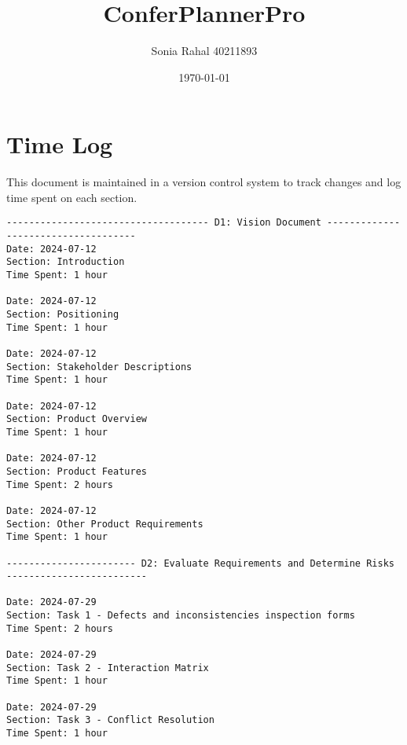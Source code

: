 \documentclass{article}
\begin{document}
\title{ConferPlannerPro}
\author{Sonia Rahal 40211893}
\date{\today}
\maketitle

\section{Time Log}
This document is maintained in a version control system to track changes and log time spent on each section.
\begin{verbatim}
------------------------------------ D1: Vision Document ------------------------------------
Date: 2024-07-12
Section: Introduction
Time Spent: 1 hour

Date: 2024-07-12
Section: Positioning
Time Spent: 1 hour

Date: 2024-07-12
Section: Stakeholder Descriptions
Time Spent: 1 hour

Date: 2024-07-12
Section: Product Overview
Time Spent: 1 hour

Date: 2024-07-12
Section: Product Features
Time Spent: 2 hours

Date: 2024-07-12
Section: Other Product Requirements
Time Spent: 1 hour

----------------------- D2: Evaluate Requirements and Determine Risks -------------------------

Date: 2024-07-29
Section: Task 1 - Defects and inconsistencies inspection forms
Time Spent: 2 hours

Date: 2024-07-29
Section: Task 2 - Interaction Matrix
Time Spent: 1 hour

Date: 2024-07-29
Section: Task 3 - Conflict Resolution
Time Spent: 1 hour

\end{verbatim}

\end{document}
